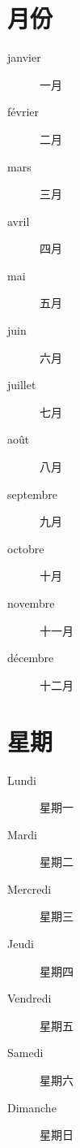 \section{月份}

\begin{description}
\item[janvier] \textipa{[Z\~avje]} 一月
\item[février] \textipa{[fevrije]} 二月
\item[mars] \textipa{[mars]} 三月
\item[avril] \textipa{[avril]} 四月
\item[mai] \textipa{[mE]} 五月
\item[juin] \textipa{[Z4\~E]} 六月
\item[juillet] \textipa{[Z4ijE]} 七月
\item[août] \textipa{[u(t)]} 八月
\item[septembre]  九月
\item[octobre] \textipa{[OktObr]} 十月
\item[novembre]  十一月
\item[décembre]  十二月
\end{description}


\section{星期}

\begin{description}
\item[Lundi] \textipa{[l\~\oe di]} 星期一
\item[Mardi] \textipa{[mardi]} 星期二
\item[Mercredi] \textipa{[mErkr@di]} 星期三
\item[Jeudi] \textipa{[Z\o di]} 星期四
\item[Vendredi] \textipa{[v\~adr@di]} 星期五
\item[Samedi] \textipa{[samdi]} 星期六
\item[Dimanche] \textipa{[dim\~aS]} 星期日
\end{description}